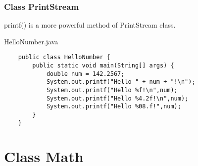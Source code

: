 \documentclass[10pt, compress]{beamer}
\begin{document}
\begin{frame}[fragile]
	\frametitle{Class PrintStream}
	printf() is a more powerful method of PrintStream class.
	\begin{block}{HelloNumber.java}
	\begin{verbatim}
	public class HelloNumber {
	    public static void main(String[] args) {
	        double num = 142.2567;
	        System.out.printf("Hello " + num + "!\n");
	        System.out.printf("Hello %f!\n",num);
	        System.out.printf("Hello %4.2f!\n",num);
	        System.out.printf("Hello %08.f!",num);
	    }
	}
	\end{verbatim}
	\end{block}
\end{frame}

\section{Class Math}
\end{document}
